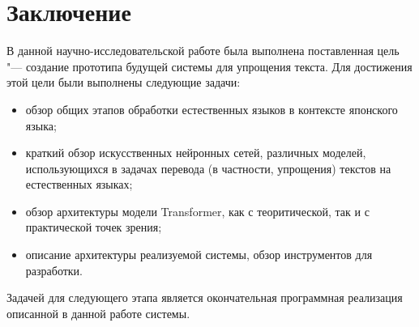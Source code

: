\chapter*{Заключение} \label{ch-conclusion}

В данной научно-исследовательской работе была выполнена поставленная цель "--- создание прототипа будущей системы для упрощения текста. Для достижения этой цели были выполнены следующие задачи:
\begin{itemize}%
  \item обзор общих этапов обработки естественных языков в контексте японского языка;
  \item краткий обзор искусственных нейронных сетей, различных моделей, использующихся в задачах перевода (в частности, упрощения) текстов на естественных языках;
  \item обзор архитектуры модели Transformer, как с теоритической, так и с практической точек зрения;
  \item описание архитектуры реализуемой системы, обзор инструментов для разработки.
\end{itemize}

Задачей для следующего этапа является окончательная программная реализация описанной в данной работе системы.

